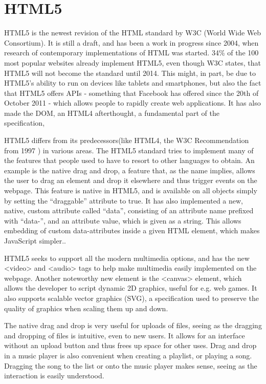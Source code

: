 \section{HTML5}
HTML5 is the newest revision of the HTML standard by W3C (World Wide Web Consortium). It is still a draft, and has been a work in progress since 2004, when research of contemporary implementations of HTML was started. 34\% of the 100 most popular websites already implement HTML5\cite{Maine11}, even though W3C states, that HTML5 will not become the standard until 2014.\cite{W3C11} This might, in part, be due to HTML5's ability to run on devices like tablets and smartphones, but also the fact that HTML5 offers APIs - something that Facebook has offered since the 20th of October 2011 \cite{Kelly11} - which allows people to rapidly create web applications. It has also made the DOM, an HTML4 afterthought, a fundamental part of the specification, 

HTML5 differs from its predecessors(like HTML4, the W3C Recommendation from 1997 \cite{Kesteren11}) in various areas. The HTML5 standard tries to implement many of the features that people used to have to resort to other languages to obtain. An example is the native drag and drop, a feature that, as the name implies, allows the user to drag an element and drop it elsewhere and thus trigger events on the webpage. This feature is native in HTML5, and is available on all objects simply by setting the ``draggable'' attribute to true. It has also implemented a new, native, custom attribute called ``data'', consisting of an attribute name prefixed with ``data-'', and an attribute value, which is given as a string. This allows embedding of custom data-attributes inside a given HTML element, which makes JavaScript simpler.\cite{Bewick10}. 

HTML5 seeks to support all the modern multimedia options, and has the new <video> and <audio> tags to help make multimedia easily implemented on the webpage. Another noteworthy new element is the <canvas> element, which allows the developer to script dynamic 2D graphics, useful for e.g. web games. 
It also supports scalable vector graphics (SVG), a specification used to preserve the quality of graphics when scaling them up and down.

The native drag and drop is very useful for uploads of files, seeing as the dragging and dropping of files is intuitive, even to new users. It allows for an interface without an upload button and thus frees up space for other uses. Drag and drop in a music player is also convenient when creating a playlist, or playing a song. Dragging the song to the list or onto the music player makes sense, seeing as the interaction is easily understood. 

